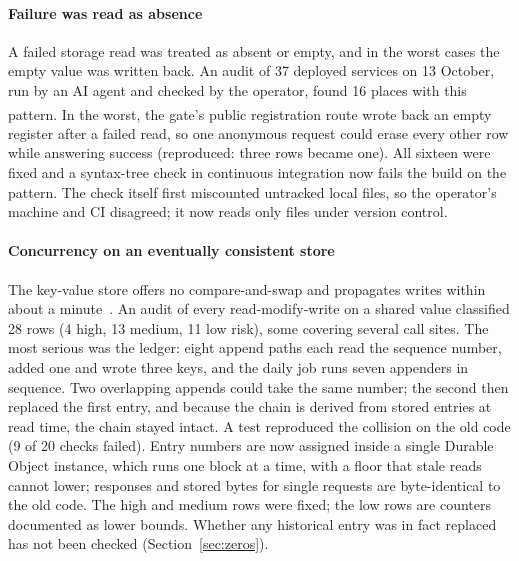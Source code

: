 \documentclass[preprint,12pt,authoryear]{elsarticle}
\newcommand{\priv}{\textsuperscript{\textdagger}}
\begin{document}
\paragraph{Failure was read as absence} A failed storage read was treated as absent or empty, and in the worst cases the empty value was written back. An audit of 37 deployed services on 13 October, run by an AI agent and checked by the operator, found 16 places with this pattern\priv. In the worst, the gate's public registration route wrote back an empty register after a failed read, so one anonymous request could erase every other row while answering success (reproduced: three rows became one). All sixteen were fixed and a syntax-tree check in continuous integration now fails the build on the pattern. The check itself first miscounted untracked local files, so the operator's machine and CI disagreed; it now reads only files under version control.

\paragraph{Concurrency on an eventually consistent store} The key-value store offers no compare-and-swap and propagates writes within about a minute~\citep{cfkv}. An audit of every read-modify-write on a shared value classified 28 rows (4 high, 13 medium, 11 low risk), some covering several call sites. The most serious was the ledger: eight append paths each read the sequence number, added one and wrote three keys, and the daily job runs seven appenders in sequence. Two overlapping appends could take the same number; the second then replaced the first entry, and because the chain is derived from stored entries at read time, the chain stayed intact. A test reproduced the collision on the old code (9 of 20 checks failed). Entry numbers are now assigned inside a single Durable Object instance, which runs one block at a time, with a floor that stale reads cannot lower; responses and stored bytes for single requests are byte-identical to the old code. The high and medium rows were fixed; the low rows are counters documented as lower bounds. Whether any historical entry was in fact replaced has not been checked (Section~\ref{sec:zeros}).
\end{document}
